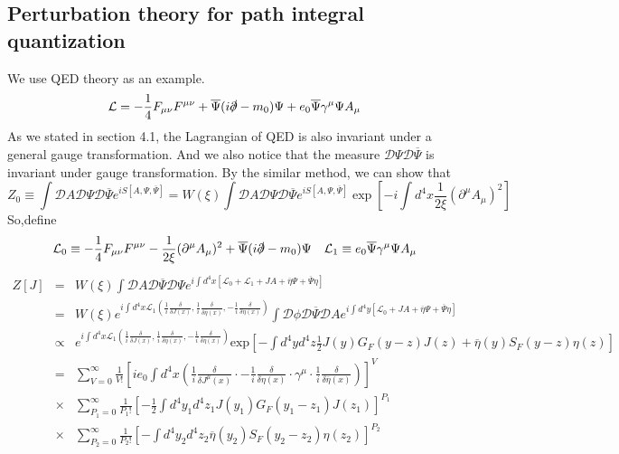 \subsection{Perturbation theory for path integral quantization}
\noindent
We use QED theory as an example.
\[\mathcal{L} = -\frac{1}{4}F_{\mu\nu}F^{\mu\nu} + \overline{\Psi} (i\slashed{\partial}-m_0) \Psi + e_0\overline{\Psi}\gamma^{\mu}\Psi A_{\mu}\]
As we stated in section 4.1, the Lagrangian of QED is also invariant under a general gauge transformation. And we also notice that the measure $\mathcal{D}\Psi \mathcal{D}\overline{\Psi}$ is invariant under gauge transformation. By the similar method, we can show that
\[Z_0 \equiv \int \mathcal{D}A \mathcal{D}\Psi \mathcal{D}\overline{\Psi}e^{iS[A,\Psi,\overline{\Psi}]} = W(\xi)\int \mathcal{D}A \mathcal{D}\Psi \mathcal{D}\overline{\Psi}e^{iS[A,\Psi,\overline{\Psi}]} \exp\left[ -i \int d^4x \frac{1}{2\xi} (\partial^{\mu}A_{\mu})^2\right] \]
So,define
\[\mathcal{L}_0 \equiv -\frac{1}{4}F_{\mu\nu}F^{\mu\nu} - \frac{1}{2\xi} (\partial^{\mu}A_{\mu})^2 + \overline{\Psi} (i\slashed{\partial}-m_0) \Psi \quad \mathcal{L}_1 \equiv e_0\overline{\Psi}\gamma^{\mu}\Psi A_{\mu}\]
\begin{eqnarray}
Z[J] &=& W(\xi) \int \mathcal{D}A \mathcal{D}\overline{\Psi} \mathcal{D}\Psi e^{i\int d^4x [\mathcal{L}_0 + \mathcal{L}_1 + JA + \overline{\eta}\Psi + \overline{\Psi}\eta]} \nonumber \\
&=& W(\xi) e^{i\int d^4x \mathcal{L}_1(\frac{1}{i} \frac{\delta}{\delta J(x)},\frac{1}{i}\frac{\delta}{\delta \overline{\eta}(x)},-\frac{1}{i}\frac{\delta}{\delta \eta(x)})} \int \mathcal{D}\phi \mathcal{D}\overline{\Psi} \mathcal{D}A e^{i\int d^4y [\mathcal{L}_0 + JA + \overline{\eta}\Psi + \overline{\Psi}\eta]} \nonumber \\
&\propto & e^{i\int d^4x \mathcal{L}_1(\frac{1}{i} \frac{\delta}{\delta J(x)},\frac{1}{i}\frac{\delta}{\delta \overline{\eta}(x)},-\frac{1}{i}\frac{\delta}{\delta \eta(x)})} \mathrm{exp} [- \int d^4y d^4z  \frac{1}{2} J(y)G_F(y-z)J(z) + \overline{\eta}(y)S_F(y-z)\eta(z)] \nonumber \\
& =& \sum_{V=0}^{\infty} \frac{1}{V!} [ie_0 \int d^4x (\frac{1}{i} \frac{\delta}{\delta J^{\mu}(x)} \cdot -\frac{1}{i}\frac{\delta}{\delta \eta(x)} \cdot \gamma^{\mu} \cdot  \frac{1}{i}\frac{\delta}{\delta \overline{\eta}(x)})]^V \nonumber \\
&\times & \sum_{P_1=0}^{\infty} \frac{1}{P_1!} [-\frac{1}{2} \int d^4y_1 d^4z_1 J(y_1)G_F(y_1-z_1)J(z_1)]^{P_1} \nonumber \\
&\times &  \sum_{P_2=0}^{\infty} \frac{1}{P_2!} [-\int d^4y_2 d^4z_2 \overline{\eta}(y_2)S_F(y_2-z_2)\eta(z_2)]^{P_2} \nonumber
\end{eqnarray}
